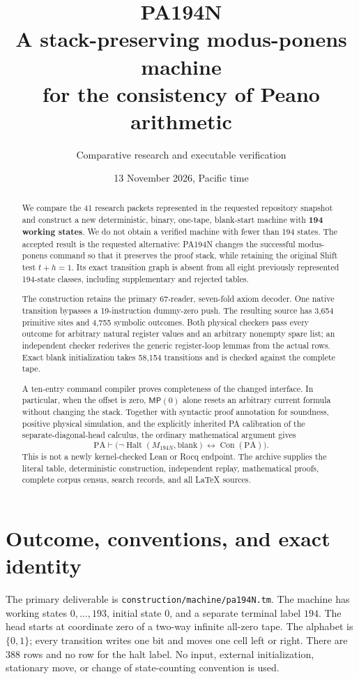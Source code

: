 \documentclass[11pt,letterpaper]{article}
\title{\textcolor{ink}{PA194N}\\A stack-preserving modus-ponens machine\\for the consistency of Peano arithmetic}
\author{Comparative research and executable verification}
\date{13 November 2026, Pacific time}
\newcommand{\PA}{\mathrm{PA}}
\newcommand{\Con}{\operatorname{Con}}
\newcommand{\Halt}{\operatorname{Halt}}
\newcommand{\file}[1]{\texttt{\nolinkurl{#1}}}
\newcommand{\MN}{M_{194N}}
\newcommand{\MP}{\mathsf{MP}}
\begin{document}
\maketitle
\begin{abstract}
We compare the 41 research packets represented in the requested repository
snapshot and construct a new deterministic, binary, one-tape, blank-start
machine with \textbf{194 working states}. We do not obtain a verified
machine with fewer than 194 states. The accepted result is the requested
alternative: PA194N changes the successful modus-ponens command so that
it preserves the proof stack, while retaining the original Shift test
$t+h=1$. Its exact transition graph is absent from all eight previously
represented 194-state classes, including supplementary and rejected tables.

The construction retains the primary 67-reader, seven-fold axiom decoder.
One native transition bypasses a 19-instruction dummy-zero push. The resulting
source has 3,654 primitive sites and 4,755 symbolic outcomes. Both physical
checkers pass every outcome for arbitrary natural register values and an
arbitrary nonempty spare list; an independent checker rederives the generic
register-loop lemmas from the actual rows. Exact blank initialization takes
58,154 transitions and is checked against the complete tape.

A ten-entry command compiler proves completeness of the changed interface.
In particular, when the offset is zero, $\MP(0)$ alone resets an arbitrary current formula without
changing the stack. Together with syntactic proof annotation for soundness,
positive physical simulation, and the explicitly inherited PA calibration
of the separate-diagonal-head calculus, the ordinary mathematical argument gives
\[
 \PA\vdash\bigl(\neg\Halt(\MN,\mathrm{blank})
                  \leftrightarrow\Con(\PA)\bigr).
\]
This is not a newly kernel-checked Lean or Rocq endpoint. The archive supplies
the literal table, deterministic construction, independent replay, mathematical
proofs, complete corpus census, search records, and all LaTeX sources.
\end{abstract}
\clearpage
{\small\setlength{\parskip}{0pt}\tableofcontents}
\newpage

\section{Outcome, conventions, and exact identity}
\label{sec:result}

The primary deliverable is \file{construction/machine/pa194N.tm}.
The machine has working states $0,\ldots,193$, initial state $0$, and a
separate terminal label $194$. The head starts at coordinate zero of a
two-way infinite all-zero tape. The alphabet is $\{0,1\}$; every transition
writes one bit and moves one cell left or right. There are 388 rows and no
row for the halt label. No input, external initialization, stationary move,
or change of state-counting convention is used.
\end{document}
